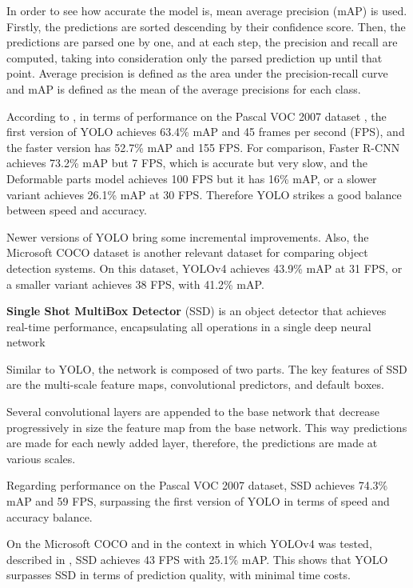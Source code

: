         In order to see how accurate the model is, mean average precision (mAP) is used. Firstly, the predictions are sorted descending by their confidence score. Then, the predictions are parsed one by one, and at each step, the precision and recall are computed, taking into consideration only the parsed prediction up until that point. Average precision is defined as the area under the precision-recall curve and mAP is defined as the mean of the average precisions for each class.%
            
        According to \cite{yolo}, in terms of performance on the Pascal VOC 2007 dataset \cite{pascal-voc-2007}, the first version of YOLO achieves 63.4\% mAP and 45 frames per second (FPS), and the faster version has 52.7\% mAP and 155 FPS. For comparison, Faster R-CNN \cite{fasterRcnn} achieves 73.2\% mAP but 7 FPS, which is accurate but very slow, and the Deformable parts model \cite{30hzDPM} achieves 100 FPS but it has 16\% mAP, or a slower variant achieves 26.1\% mAP at 30 FPS. Therefore YOLO strikes a good balance between speed and accuracy.
        
        Newer versions of YOLO bring some incremental improvements. Also, the Microsoft COCO dataset \cite{coco} is another relevant dataset for comparing object detection systems. On this dataset, YOLOv4 \cite{yolov4} achieves 43.9\% mAP at 31 FPS, or a smaller variant achieves 38 FPS, with 41.2\% mAP.
    
        \textbf{Single Shot MultiBox Detector} (SSD) \cite{ssd} is an object detector that achieves real-time performance, encapsulating all operations in a single deep neural network
         
        Similar to YOLO, the network is composed of two parts. The key features of SSD are the multi-scale feature maps, convolutional predictors, and default boxes. 
        
        Several convolutional layers are appended to the base network that decrease progressively in size the feature map from the base network. This way predictions are made for each newly added layer, therefore, the predictions are made at various scales. 
        
        Regarding performance on the Pascal VOC 2007 dataset, SSD achieves 74.3\% mAP and 59 FPS, surpassing the first version of YOLO in terms of speed and accuracy balance.
        
        On the Microsoft COCO and in the context in which YOLOv4 was tested, described in \cite{yolov4}, SSD achieves 43 FPS with 25.1\% mAP. This shows that YOLO surpasses SSD in terms of prediction quality, with minimal time costs.


